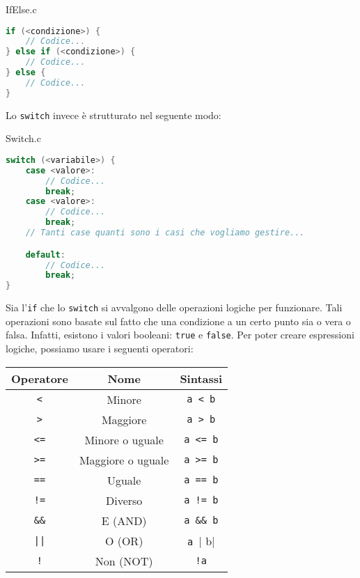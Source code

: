 \begin{codeblock}{IfElse.c}
    \begin{lstlisting}[language = c]
if (<condizione>) {
    // Codice...
} else if (<condizione>) {
    // Codice...
} else {
    // Codice...
}\end{lstlisting}
\end{codeblock}

Lo \verb|switch| invece è strutturato nel seguente modo:

\begin{codeblock}{Switch.c}
    \begin{lstlisting}[language = c]
switch (<variabile>) {
    case <valore>:
        // Codice...
        break;
    case <valore>:
        // Codice...
        break;
    // Tanti case quanti sono i casi che vogliamo gestire...

    default:
        // Codice...
        break;
}\end{lstlisting}
\end{codeblock}

Sia l'\verb|if| che lo \verb|switch| si avvalgono delle operazioni logiche per funzionare. Tali operazioni sono basate sul fatto che una condizione a un certo punto sia o vera o falsa. Infatti, esistono i valori booleani: \verb|true| e \verb|false|.
\nwl
Per poter creare espressioni logiche, possiamo usare i seguenti operatori:

\begin{center}
    \begin{tabular}{|c|c|c|}
        \hline
        \textbf{Operatore} & \textbf{Nome} & \textbf{Sintassi} \\
        \hline
        \verb|<| & Minore & \verb|a < b| \\
        \verb|>| & Maggiore & \verb|a > b| \\
        \verb|<=| & Minore o uguale & \verb|a <= b| \\
        \verb|>=| & Maggiore o uguale & \verb|a >= b| \\
        \verb|==| & Uguale & \verb|a == b| \\
        \verb|!=| & Diverso & \verb|a != b| \\
        \verb|&&| & E (AND) & \verb|a && b| \\
        \verb+||+ & O (OR) & \verb|a || b| \\
        \verb|!| & Non (NOT) & \verb|!a| \\
        \hline
    \end{tabular}
\end{center}


